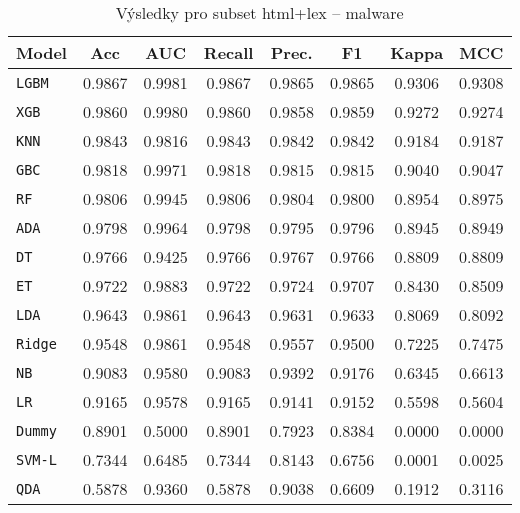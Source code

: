\begin{table}[H]
  \centering
  \small
  \caption{Výsledky pro subset html+lex – malware}
  \begin{tabular}{|l|c|c|c|c|c|c|c|}
    \hline
    \textbf{Model} & \textbf{Acc} & \textbf{AUC} & \textbf{Recall} & \textbf{Prec.} & \textbf{F1} & \textbf{Kappa} & \textbf{MCC} \\
    \hline
    \texttt{LGBM} & 0.9867 & 0.9981 & 0.9867 & 0.9865 & 0.9865 & 0.9306 & 0.9308 \\
    \texttt{XGB} & 0.9860 & 0.9980 & 0.9860 & 0.9858 & 0.9859 & 0.9272 & 0.9274 \\
    \texttt{KNN} & 0.9843 & 0.9816 & 0.9843 & 0.9842 & 0.9842 & 0.9184 & 0.9187 \\
    \texttt{GBC} & 0.9818 & 0.9971 & 0.9818 & 0.9815 & 0.9815 & 0.9040 & 0.9047 \\
    \texttt{RF} & 0.9806 & 0.9945 & 0.9806 & 0.9804 & 0.9800 & 0.8954 & 0.8975 \\
    \texttt{ADA} & 0.9798 & 0.9964 & 0.9798 & 0.9795 & 0.9796 & 0.8945 & 0.8949 \\
    \texttt{DT} & 0.9766 & 0.9425 & 0.9766 & 0.9767 & 0.9766 & 0.8809 & 0.8809 \\
    \texttt{ET} & 0.9722 & 0.9883 & 0.9722 & 0.9724 & 0.9707 & 0.8430 & 0.8509 \\
    \texttt{LDA} & 0.9643 & 0.9861 & 0.9643 & 0.9631 & 0.9633 & 0.8069 & 0.8092 \\
    \texttt{Ridge} & 0.9548 & 0.9861 & 0.9548 & 0.9557 & 0.9500 & 0.7225 & 0.7475 \\
    \texttt{NB} & 0.9083 & 0.9580 & 0.9083 & 0.9392 & 0.9176 & 0.6345 & 0.6613 \\
    \texttt{LR} & 0.9165 & 0.9578 & 0.9165 & 0.9141 & 0.9152 & 0.5598 & 0.5604 \\
    \texttt{Dummy} & 0.8901 & 0.5000 & 0.8901 & 0.7923 & 0.8384 & 0.0000 & 0.0000 \\
    \texttt{SVM-L} & 0.7344 & 0.6485 & 0.7344 & 0.8143 & 0.6756 & 0.0001 & 0.0025 \\
    \texttt{QDA} & 0.5878 & 0.9360 & 0.5878 & 0.9038 & 0.6609 & 0.1912 & 0.3116 \\
    \hline
  \end{tabular}
\end{table}
\vspace{0.5cm}

